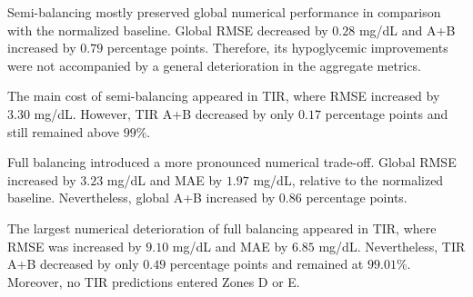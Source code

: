 \begin{table}[htbp]
    \centering
    \caption{Aggregate global and TIR performance in DiaTrend, averaged
    across balancing methods.}
    \label{tab:diatrend_global_tir}
\end{table}

Semi-balancing mostly preserved global numerical performance in comparison with the normalized baseline. Global RMSE decreased by \(0.28\) mg/dL and A+B increased by \(0.79\) percentage points. Therefore, its hypoglycemic improvements were not accompanied by a general deterioration in the aggregate metrics.

The main cost of semi-balancing appeared in TIR, where RMSE increased by \(3.30\) mg/dL. However, TIR A+B decreased by only \(0.17\) percentage points and still remained above \(99\%\).

Full balancing introduced a more pronounced numerical trade-off. Global RMSE increased by \(3.23\) mg/dL and MAE by \(1.97\) mg/dL, relative to the normalized baseline. Nevertheless, global A+B increased by \(0.86\) percentage points.

The largest numerical deterioration of full balancing appeared in TIR, where RMSE was increased by \(9.10\) mg/dL and MAE by \(6.85\) mg/dL. Nevertheless, TIR A+B decreased by only \(0.49\) percentage points and remained at \(99.01\%\). Moreover, no TIR predictions entered Zones D or E.

